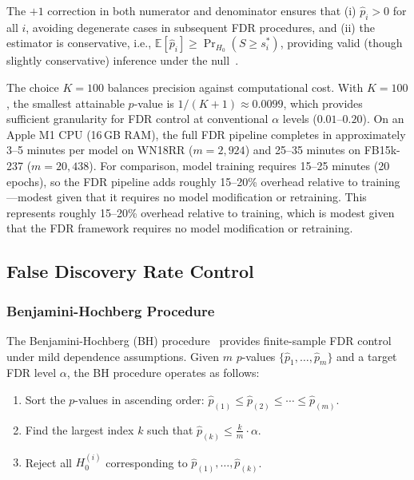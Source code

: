 The $+1$ correction in both numerator and denominator ensures that (i) $\hat{p}_i > 0$ for all $i$, avoiding degenerate cases in subsequent FDR procedures, and (ii) the estimator is conservative, i.e., $\mathbb{E}[\hat{p}_i] \geq \Pr_{H_0}(S \geq s_i^*)$, providing valid (though slightly conservative) inference under the null~\cite{davison1997bootstrap}.

The choice $K = 100$ balances precision against computational cost. With $K = 100$, the smallest attainable $p$-value is $1/(K+1) \approx 0.0099$, which provides sufficient granularity for FDR control at conventional $\alpha$ levels ($0.01$--$0.20$).
On an Apple M1 CPU (16\,GB RAM), the full FDR pipeline completes in approximately 3--5 minutes per model on WN18RR ($m = 2{,}924$) and 25--35 minutes on FB15k-237 ($m = 20{,}438$).
For comparison, model training requires 15--25 minutes (20 epochs), so the FDR pipeline adds roughly 15--20\% overhead relative to training---modest given that it requires no model modification or retraining.
This represents roughly 15--20\% overhead relative to training, which is modest given that the FDR framework requires no model modification or retraining.

\subsection{False Discovery Rate Control}
\label{subsec:bh}

\subsubsection{Benjamini-Hochberg Procedure}
\label{subsec:bh-procedure}

The Benjamini-Hochberg (BH) procedure~\cite{benjamini1995controlling} provides finite-sample FDR control under mild dependence assumptions.
Given $m$ $p$-values $\{\hat{p}_1, \dots, \hat{p}_m\}$ and a target FDR level $\alpha$, the BH procedure operates as follows:
\begin{enumerate}
    \item Sort the $p$-values in ascending order: $\hat{p}_{(1)} \leq \hat{p}_{(2)} \leq \cdots \leq \hat{p}_{(m)}$.
    \item Find the largest index $k$ such that $\hat{p}_{(k)} \leq \frac{k}{m} \cdot \alpha$.
    \item Reject all $H_0^{(i)}$ corresponding to $\hat{p}_{(1)}, \dots, \hat{p}_{(k)}$.
\end{enumerate}

